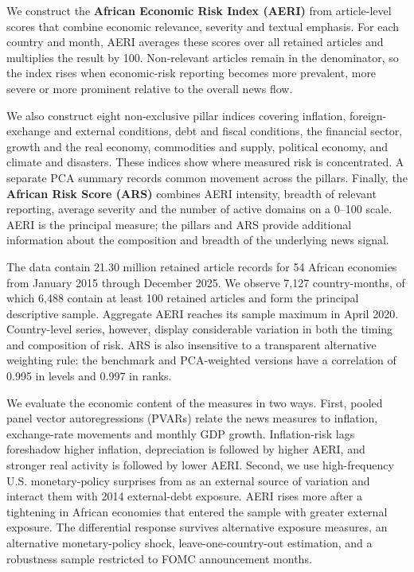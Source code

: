 \documentclass[12pt]{article}
\begin{document}
We construct the \textbf{African Economic Risk Index (AERI)} from article-level scores that combine economic relevance, severity and textual emphasis. For each country and month, AERI averages these scores over all retained articles and multiplies the result by 100. Non-relevant articles remain in the denominator, so the index rises when economic-risk reporting becomes more prevalent, more severe or more prominent relative to the overall news flow.

We also construct eight non-exclusive pillar indices covering inflation, foreign-exchange and external conditions, debt and fiscal conditions, the financial sector, growth and the real economy, commodities and supply, political economy, and climate and disasters. These indices show where measured risk is concentrated. A separate PCA summary records common movement across the pillars. Finally, the \textbf{African Risk Score (ARS)} combines AERI intensity, breadth of relevant reporting, average severity and the number of active domains on a 0--100 scale. AERI is the principal measure; the pillars and ARS provide additional information about the composition and breadth of the underlying news signal.

The data contain 21.30 million retained article records for 54 African economies from January 2015 through December 2025. We observe 7,127 country-months, of which 6,488 contain at least 100 retained articles and form the principal descriptive sample. Aggregate AERI reaches its sample maximum in April 2020. Country-level series, however, display considerable variation in both the timing and composition of risk. ARS is also insensitive to a transparent alternative weighting rule: the benchmark and PCA-weighted versions have a correlation of 0.995 in levels and 0.997 in ranks.

We evaluate the economic content of the measures in two ways. First, pooled panel vector autoregressions (PVARs) relate the news measures to inflation, exchange-rate movements and monthly GDP growth. Inflation-risk lags foreshadow higher inflation, depreciation is followed by higher AERI, and stronger real activity is followed by lower AERI. Second, we use high-frequency U.S. monetary-policy surprises from \citet{jarocinski2020} as an external source of variation and interact them with 2014 external-debt exposure. AERI rises more after a tightening in African economies that entered the sample with greater external exposure. The differential response survives alternative exposure measures, an alternative monetary-policy shock, leave-one-country-out estimation, and a robustness sample restricted to FOMC announcement months.
\end{document}
